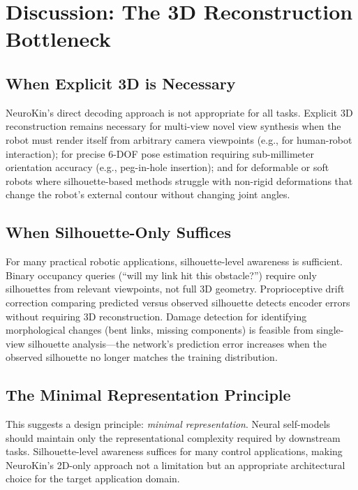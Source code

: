 \documentclass[12pt,a4paper,oneside]{report}
\begin{document}
\section{Discussion: The 3D Reconstruction Bottleneck}
\subsection{When Explicit 3D is Necessary}
\label{subsec:when_explicit_3d_is_necessary}

NeuroKin's direct decoding approach is not appropriate for all tasks. Explicit 3D reconstruction remains necessary for multi-view novel view synthesis when the robot must render itself from arbitrary camera viewpoints (e.g., for human-robot interaction); for precise 6-DOF pose estimation requiring sub-millimeter orientation accuracy (e.g., peg-in-hole insertion); and for deformable or soft robots where silhouette-based methods struggle with non-rigid deformations that change the robot's external contour without changing joint angles.
\subsection{When Silhouette-Only Suffices}
\label{subsec:when_silhouette_only_suppices}

For many practical robotic applications, silhouette-level awareness is sufficient. Binary occupancy queries (``will my link hit this obstacle?'') require only silhouettes from relevant viewpoints, not full 3D geometry. Proprioceptive drift correction comparing predicted versus observed silhouette detects encoder errors without requiring 3D reconstruction. Damage detection for identifying morphological changes (bent links, missing components) is feasible from single-view silhouette analysis---the network's prediction error increases when the observed silhouette no longer matches the training distribution.
\subsection{The Minimal Representation Principle}
\label{subsec:the_minimal_representation_principle}

This suggests a design principle: \textit{minimal representation}. Neural self-models should maintain only the representational complexity required by downstream tasks. Silhouette-level awareness suffices for many control applications, making NeuroKin's 2D-only approach not a limitation but an appropriate architectural choice for the target application domain.
\end{document}
